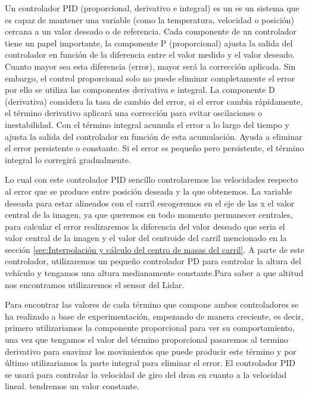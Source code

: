  Un controlador PID (proporcional, derivativo e integral) es un 
  es un sistema que es capaz de mantener una variable (como la temperatura, velocidad o posición) cercana a un valor deseado o de referencia. Cada componente de un controlador tiene un papel 
  importante,
  la componente P (proporcional) ajusta la salida del controlador en función de la diferencia entre el valor medido y el valor deseado. 
  Cuanto mayor sea esta diferencia (error), mayor será la corrección aplicada. Sin embargo, el control proporcional solo no puede eliminar completamente el error por ello se utiliza
  las componentes derivativa e integral. La componente D (derivativa) considera la tasa de cambio del error,
  si el error cambia rápidamente, el término derivativo aplicará una corrección para evitar oscilaciones o inestabilidad.
  Con el término integral acumula el error a lo largo del tiempo y ajusta la salida del controlador en función de esta acumulación. 
  Ayuda a eliminar el error persistente o constante. Si el error es pequeño pero persistente, el término integral lo corregirá gradualmente.
  \newline

  Lo cual con este controlador PID sencillo controlaremos las velocidades respecto al error que se produce entre posición deseada y la que obtenemos. La variable deseada para estar alineados con el carril escogeremos 
  en el eje de las x el valor central de la imagen, ya que queremos en todo momento permanecer centrales, para calcular el error realizaremos la diferencia del valor deseado que seria 
  el valor central de la imagen y el valor del centroide del carril mencionado en la sección \ref{sec:Interpolación y cálculo del centro de masas del carril}. 
  A parte de este controlador, utilizaremos un pequeño controlador PD para controlar la altura del vehículo y tengamos una altura medianamente constante.Para saber a que altitud nos encontramos utilizaremos el sensor del Lidar. \newline

  Para encontrar las valores de cada término que compone ambos controladores se ha realizado a base de experimentación, empezando de manera creciente, es decir, primero utilizariamos
  la componente proporcional para ver su comportamiento, una vez que tengamos el valor del término proporcional pasaremos al termino derivativo para suavizar los movimientos que puede
  producir este término y por último utilizariamos la parte integral para eliminar el error. El controlador PID se usará para controlar la velocidad de giro del dron en cuanto a la velocidad lineal. \newline
  tendremos un valor constante. 

